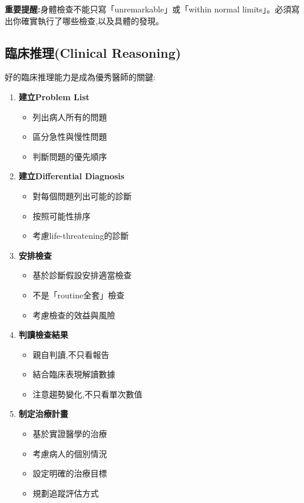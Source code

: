 \documentclass[12pt,a4paper]{article}
\newcommand{\note}[1]{
    \par
    \noindent
    \begin{tcolorbox}[
        colback=emergency_blue!5!white,
        colframe=emergency_blue,
        title=\textbf{重點提醒},
        fonttitle=\bfseries,
        boxrule=0.5pt,
        arc=3pt,
        left=6pt,
        right=6pt,
        top=6pt,
        bottom=6pt
    ]
    #1
    \end{tcolorbox}
}
\begin{document}
\note{
\textbf{重要提醒:}身體檢查不能只寫「unremarkable」或「within normal limits」。必須寫出你確實執行了哪些檢查,以及具體的發現。
}

\subsection{臨床推理(Clinical Reasoning)}

好的臨床推理能力是成為優秀醫師的關鍵:

\begin{enumerate}[leftmargin=*]
\item \textbf{建立Problem List}
\begin{itemize}
\item 列出病人所有的問題
\item 區分急性與慢性問題
\item 判斷問題的優先順序
\end{itemize}

\item \textbf{建立Differential Diagnosis}
\begin{itemize}
\item 對每個問題列出可能的診斷
\item 按照可能性排序
\item 考慮life-threatening的診斷
\end{itemize}

\item \textbf{安排檢查}
\begin{itemize}
\item 基於診斷假設安排適當檢查
\item 不是「routine全套」檢查
\item 考慮檢查的效益與風險
\end{itemize}

\item \textbf{判讀檢查結果}
\begin{itemize}
\item 親自判讀,不只看報告
\item 結合臨床表現解讀數據
\item 注意趨勢變化,不只看單次數值
\end{itemize}

\item \textbf{制定治療計畫}
\begin{itemize}
\item 基於實證醫學的治療
\item 考慮病人的個別情況
\item 設定明確的治療目標
\item 規劃追蹤評估方式
\end{itemize}
\end{enumerate}
\end{document}
